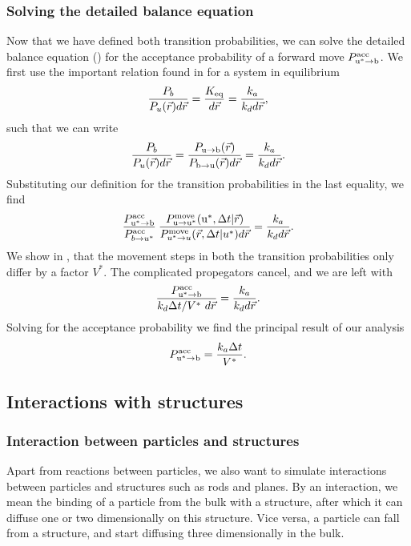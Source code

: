 \subsubsection{Solving the detailed balance equation}
Now that we have defined both transition probabilities, we can solve the detailed balance equation () for the acceptance probability of a forward move $P^{\rm acc}_{{\rm u}^* \to {\rm b}}$. We first use the important relation found in \cite{Morelli2008a} for a system in equilibrium
\begin{equation}
 \frac{P_b}{P_u(\vec{r})d\vec{r}} = \frac{K_{\rm eq}}{d\vec{r}} = \frac{k_a}{k_d d\vec{r}},
\end{equation}
such that we can write
\begin{equation}
 \frac{P_b}{P_u(\vec{r})d\vec{r}} = \frac{P_{ \rm{u} \to \rm{b} }(\vec{r})}{P_{ \rm{b} \to \rm{u} }(\vec{r})d\vec{r}} = \frac{k_a}{k_d d\vec{r}}.
\end{equation}
Substituting our definition for the transition probabilities in the last equality, we find
\begin{equation}
 \frac{P^{\rm acc}_{{\rm u}^* \to {\rm b}}}{P^{\rm acc}_{b \to u^*}} \: \frac{P^{\rm move}_{{\rm u} \to {\rm u}^*}({\rm u}^*,\Delta t|\vec{r})}{P^{\rm move}_{u^* \to u}(\vec{r},\Delta t|u^*)d\vec{r}} = \frac{k_a}{k_d d\vec{r}}.
\end{equation}
We show in , that the movement steps in both the transition probabilities only differ by a factor $V^*$. The complicated propegators cancel, and we are left with
\begin{equation}
 \frac{P^{\rm acc}_{{\rm u}^* \to {\rm b}}}{k_d \Delta t/V^* \,\, d\vec{r}} = \frac{k_a}{k_d d\vec{r}}.
\elabel{semi-pivotal}
\end{equation}
Solving for the acceptance probability we find the principal result of our analysis
\begin{equation}
 P^{\rm acc}_{{\rm u}^* \to {\rm b}} = \frac{k_a \Delta t}{V^*}.
\elabel{pivotal}
\end{equation}


\subsection{Interactions with structures}

\subsubsection{Interaction between particles and structures}
Apart from reactions between particles, we also want to simulate interactions between particles and structures such as rods and planes. By an interaction, we mean the binding of a particle from the bulk with a structure, after which it can diffuse one or two dimensionally on this structure. Vice versa, a particle can fall from a structure, and start diffusing three dimensionally in the bulk.

